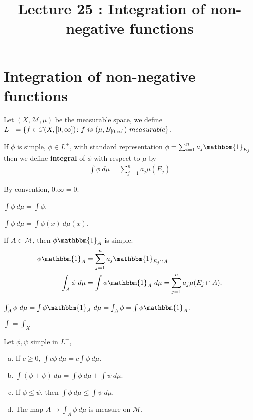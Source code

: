 \documentclass[a4paper,english,12pt]{article}   	%
\title{Lecture 25 : Integration of non-negative functions}
\author{}
\begin{document}
\maketitle
\section{Integration of non-negative functions}
\begin{defn}
Let $(X, \mathcal{M},\mu)$ be the measurable space, we define $L^{+} = \{f \in \mathcal{F}(X,[0,\infty]) \colon f ~is  ~ (\mu , B_{[0,\infty]}) ~measurable  \}$.
\end{defn}
\begin{defn}
If $\phi$ is simple, $\phi \in L^{+}$, with standard representation $\phi = \sum_{i =1}^{n} a_{j} \mathbbm{1}_{E_{j}}$ then we define \textbf{integral} of $\phi$ with respect to $\mu$ by
\begin{align*}
\int \phi ~d\mu = \sum_{j=1}^{n} a_{j} \mu(E_{j})
\end{align*}
\end{defn}
\begin{rem}
By convention, $0 . \infty = 0$.
\end{rem}
\begin{rem}
$\int \phi ~d\mu = \int \phi $.
\end{rem}
\begin{rem}
$\int \phi ~d\mu = \int \phi(x)~d\mu(x)$.
\end{rem}
\begin{rem}
If $A \in \mathcal{M}$, then $\phi \mathbbm{1}_{A}$ is simple.
\begin{align*}
\phi \mathbbm{1}_{A} &= \sum_{j=1}^{n} a_{j} \mathbbm{1}_{E_{j}\cap A} \\
\int_{A} \phi ~d\mu &= \int \phi \mathbbm{1}_{A} ~d\mu = \sum_{j=1}^{n} a_{j} \mu(E_{j} \cap A).
\end{align*}
\end{rem}
\begin{rem}
$ \int_{A} \phi ~d\mu = \int \phi \mathbbm{1}_{A} ~d\mu = \int_{A} \phi = \int \phi \mathbbm{1}_{A}$.
\end{rem}
\begin{rem}
$\int = \int_{X}$
\end{rem}
\begin{prop}
Let $\phi,\psi$ simple in $L^{+}$,
\begin{enumerate}[a)]
\item If $c \geq 0$, $ \int c \phi ~d\mu = c \int \phi ~d\mu$. 
\item $\int (\phi + \psi) ~d\mu = \int \phi ~d\mu + \int \psi ~d\mu$.
\item If $\phi \leq \psi$, then $\int \phi ~d\mu \leq \int \psi ~d\mu$.
\item The map $A \to \int_{A} \phi ~d\mu$ is measure on $\mathcal{M}$.
\end{enumerate}
\end{prop}
\end{document}
